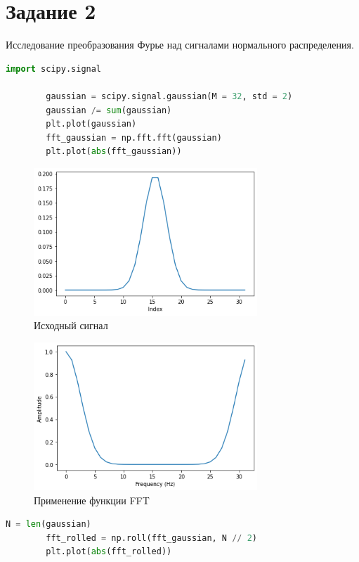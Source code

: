 \documentclass[a4paper, 12pt]{report}
\begin{document}
	\section{Задание 2}
	Исследование преобразования Фурье над сигналами нормального распределения.
	\begin{lstlisting}[language=Python,caption=Получение сигнала]
		import scipy.signal

		gaussian = scipy.signal.gaussian(M = 32, std = 2)
		gaussian /= sum(gaussian)
		plt.plot(gaussian)
		fft_gaussian = np.fft.fft(gaussian)
		plt.plot(abs(fft_gaussian))
	\end{lstlisting}
	\begin{figure}[H]
		\centering
		\includegraphics[width=0.75\textwidth]{task1.png}
		\caption{Исходный сигнал}
		\label{fig:task1}
	\end{figure}
	\begin{figure}[H]
		\centering
		\includegraphics[width=0.75\textwidth]{task2.png}
		\caption{Применение функции FFT}
		\label{fig:task2}
	\end{figure}
	\begin{lstlisting}[language=Python,caption=Сдвинули отрицательные частоты влево]
		N = len(gaussian)
		fft_rolled = np.roll(fft_gaussian, N // 2)
		plt.plot(abs(fft_rolled))
	\end{lstlisting}
\end{document}
